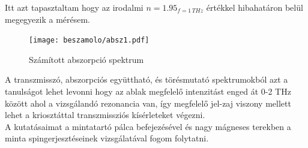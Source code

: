 \documentclass[a4paper,12pt]{article}
\numberwithin{equation}{section}
\begin{document}
Itt azt tapasztaltam hogy az irodalmi $n = 1.95_{f = 1\,THz}$ \cite{naftaly2021terahertz} értékkel hibahatáron belül megegyezik a mérésem.



\begin{figure}[H]
\begin{center}


\texttt{[image: beszamolo/absz1.pdf]}




\end{center}
\caption{Számított abszorpció spektrum}

\label{fig:absz}
\end{figure}

\noindent A transzmisszó, abszorpciós együttható, és törésmutató spektrumokból azt a tanulságot lehet levonni hogy az ablak megfelelő intenzitást enged át 0-2 THz között ahol a vizsgálandó rezonancia van, így megfelelő jel-zaj viszony mellett lehet a kriosztáttal transzmissziós kísérleteket végezni.\\
A kutatásaimat a mintatartó pálca befejezésével és nagy mágneses terekben a minta spingerjesztéseinek vizsgálatával fogom folytatni.





\newpage

\printbibliography
\end{document}

